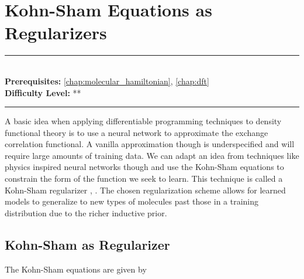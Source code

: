\documentclass[book.tex]{subfiles}
\begin{document}
\chapter{Kohn-Sham Equations as Regularizers}
\label{chap:dft_e3nn}
\noindent\rule{11cm}{0.4pt} \\
\textbf{Prerequisites:} \autoref{chap:molecular_hamiltonian}, \autoref{chap:dft} \\
\textbf{Difficulty Level:} ** \\
\noindent\rule{11cm}{0.4pt}
\vspace{5mm}



A basic idea when applying differentiable programming techniques to density functional theory is to use a neural network to approximate the exchange correlation functional. A vanilla approximation though is underspecified and will require large amounts of training data. We can adapt an idea from techniques like physics inspired neural networks though and use the Kohn-Sham equations to constrain the form of the function we seek to learn. This technique is called a Kohn-Sham regularizer \cite{li2021kohn},  \cite{kalita2021generalizability}. The chosen regularization scheme allows for learned models to generalize to new types of molecules past those in a training distribution due to the richer inductive prior.

\section{Kohn-Sham as Regularizer}

The Kohn-Sham equations are given by
\end{document}
